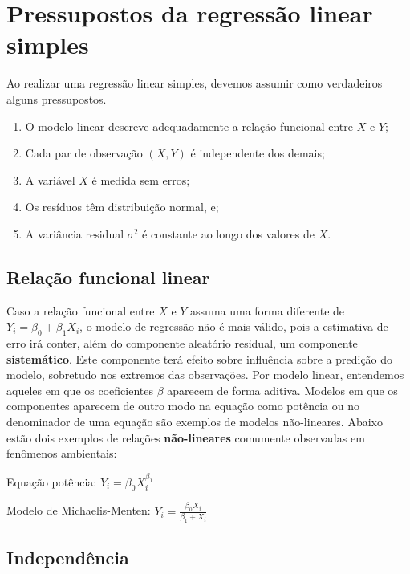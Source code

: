 \documentclass[
]{book}
\providecommand{\tightlist}{%
  \setlength{\itemsep}{0pt}\setlength{\parskip}{0pt}}
\begin{document}
\hypertarget{pressupostos-da-regressuxe3o-linear-simples}{%
\section{Pressupostos da regressão linear simples}\label{pressupostos-da-regressuxe3o-linear-simples}}

Ao realizar uma regressão linear simples, devemos assumir como verdadeiros alguns pressupostos.

\begin{enumerate}
\def\labelenumi{\arabic{enumi}.}
\tightlist
\item
  O modelo linear descreve adequadamente a relação funcional entre \(X\) e \(Y\);
\item
  Cada par de observação \((X,Y)\) é independente dos demais;
\item
  A variável \(X\) é medida sem erros;
\item
  Os resíduos têm distribuição normal, e;
\item
  A variância residual \(\sigma^2\) é constante ao longo dos valores de \(X\).
\end{enumerate}

\hypertarget{relauxe7uxe3o-funcional-linear}{%
\subsection{Relação funcional linear}\label{relauxe7uxe3o-funcional-linear}}

Caso a relação funcional entre \(X\) e \(Y\) assuma uma forma diferente de \(Y_i = \beta_0 + \beta_1X_i\), o modelo de regressão não é mais válido, pois a estimativa de erro irá conter, além do componente aleatório residual, um componente \textbf{sistemático}. Este componente terá efeito sobre influência sobre a predição do modelo, sobretudo nos extremos das observações. Por modelo linear, entendemos aqueles em que os coeficientes \(\beta\) aparecem de forma aditiva. Modelos em que os componentes aparecem de outro modo na equação como potência ou no denominador de uma equação são exemplos de modelos não-lineares. Abaixo estão dois exemplos de relações \textbf{não-lineares} comumente observadas em fenômenos ambientais:

Equação potência: \(Y_i = \beta_0 X_i^{\beta_1}\)

Modelo de Michaelis-Menten: \(Y_i = \frac{\beta_0 X_i}{\beta_1 + X_i}\)

\hypertarget{independuxeancia}{%
\subsection{Independência}\label{independuxeancia}}
\end{document}
